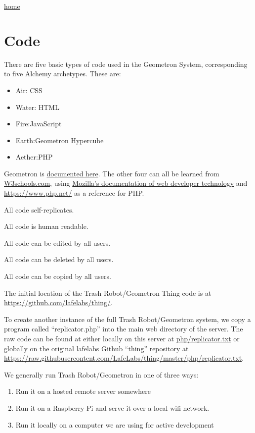 \href{index.html}{home}

\section{Code}\label{code}

There are five basic types of code used in the Geometron System,
corresponding to five Alchemy archetypes. These are:

\begin{itemize}
\tightlist
\item
  Air: CSS
\item
  Water: HTML
\item
  Fire:JavaScript
\item
  Earth:Geometron Hypercube
\item
  Aether:PHP
\end{itemize}

Geometron is \href{scrolls/geometron.md}{documented here}. The other
four can all be learned from
\href{https://www.w3schools.com/}{W3schools.com}, using
\href{https://developer.mozilla.org/en-US/}{Mozilla's documentation of
web developer technology} and \url{https://www.php.net/} as a reference
for PHP.

All code self-replicates.

All code is human readable.

All code can be edited by all users.

All code can be deleted by all users.

All code can be copied by all users.

The initial location of the Trash Robot/Geometron Thing code is at
\url{https://github.com/lafelabs/thing/}.

To create another instance of the full Trash Robot/Geometron system, we
copy a program called ``replicator.php'' into the main web directory of
the server. The raw code can be found at either locally on this server
at \url{php/replicator.txt} or globally on the original lafelabs Github
``thing'' repository at
\url{https://raw.githubusercontent.com/LafeLabs/thing/master/php/replicator.txt}.

We generally run Trash Robot/Geometron in one of three ways:

\begin{enumerate}
\def\labelenumi{\arabic{enumi}.}
\tightlist
\item
  Run it on a hosted remote server somewhere
\item
  Run it on a Raspberry Pi and serve it over a local wifi network.
\item
  Run it locally on a computer we are using for active development
\end{enumerate}


